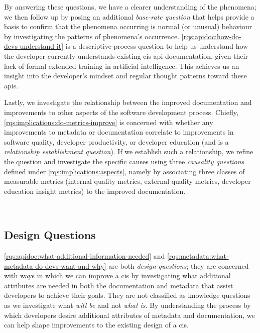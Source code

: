 By answering these questions, we have a clearer understanding of the phenomena; we then follow up by posing an additional \textit{base-rate question} that helps provide a basis to confirm that the phenomena occurring is normal (or unusual) behaviour by investigating the patterns of phenomena's occurrence. \ref{rqs:apidoc:how-do-devs-understand-it} is a descriptive-process question to help us understand how the developer currently understands existing \gls{cis} \gls{api} documentation, given their lack of formal extended training in artificial intelligence. This achieves us an insight into the developer's mindset and regular thought patterns toward these \glspl{api}.

Lastly, we investigate the relationship between the improved documentation and improvements to other aspects of the software development process. Chiefly, \ref{rqs:implications:do-metrics-improve} is concerned with whether any improvements to metadata or documentation correlate to improvements in software quality, developer productivity, or developer education (and is a \textit{relationship establishment question}). If we establish such a relationship, we refine the question and investigate the specific causes using three \textit{causality questions} defined under \ref{rqs:implications:aspects}, namely by associating three classes of measurable metrics (internal quality metrics, external quality metrics, developer education insight metrics) to the improved documentation.

\
\subsection{Design Questions}

\ref{rqs:apidoc:what-additional-information-needed} and \ref{rqs:metadata:what-metadata-do-devs-want-and-why} are both \textit{design questions}; they are concerned with ways in which we can improve a \gls{cis} by investigating what additional attributes are needed in both the documentation and metadata that assist developers to achieve their goals.  They are not classified as knowledge questions as we investigate what \textit{will be} and not \textit{what is}. By understanding the process by which developers desire additional attributes of metadata and documentation, we can help shape improvements to the existing design of a \gls{cis}. 